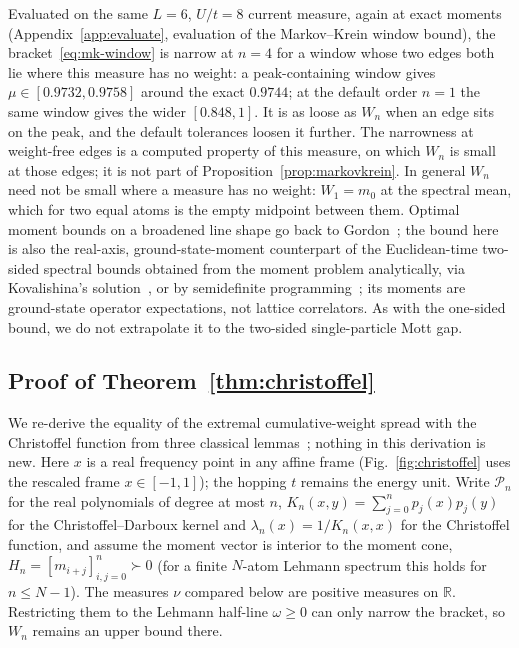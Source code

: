 \documentclass[submission, PhysCore]{SciPost}
\begin{document}
\begin{appendix}
Evaluated on the same $L=6$, $U/t=8$ current measure, again at exact moments (Appendix~\ref{app:evaluate}, evaluation of the Markov--Krein window bound), the bracket~\eqref{eq:mk-window} is narrow at $n=4$ for a window whose two edges both lie where this measure has no weight: a peak-containing window gives $\mu\in[0.9732,0.9758]$ around the exact $0.9744$; at the default order $n=1$ the same window gives the wider $[0.848,1]$. It is as loose as $W_n$ when an edge sits on the peak, and the default tolerances loosen it further. The narrowness at weight-free edges is a computed property of this measure, on which $W_n$ is small at those edges; it is not part of Proposition~\ref{prop:markovkrein}. In general $W_n$ need not be small where a measure has no weight: $W_1=m_0$ at the spectral mean, which for two equal atoms is the empty midpoint between them. Optimal moment bounds on a broadened line shape go back to Gordon~\cite{Gordon1968}; the bound here is also the real-axis, ground-state-moment counterpart of the Euclidean-time two-sided spectral bounds obtained from the moment problem analytically, via Kovalishina's solution~\cite{AbbottJayOare2025}, or by semidefinite programming~\cite{CausalBootstrap2026,CertifiedSpectral2026}; its moments are ground-state operator expectations, not lattice correlators. As with the one-sided bound, we do not extrapolate it to the two-sided single-particle Mott gap.

\subsection*{Proof of Theorem~\ref{thm:christoffel}}
We re-derive the equality of the extremal cumulative-weight spread with the Christoffel function from three classical lemmas~\cite{Akhiezer1965,KreinNudelman1977,GM2010}; nothing in this derivation is new. Here $x$ is a real frequency point in any affine frame (Fig.~\ref{fig:christoffel} uses the rescaled frame $x\in[-1,1]$); the hopping $t$ remains the energy unit. Write $\mathcal{P}_n$ for the real polynomials of degree at most $n$, $K_n(x,y)=\sum_{j=0}^{n}p_j(x)p_j(y)$ for the Christoffel--Darboux kernel and $\lambda_n(x)=1/K_n(x,x)$ for the Christoffel function, and assume the moment vector is interior to the moment cone, $H_n=[m_{i+j}]_{i,j=0}^{n}\succ 0$ (for a finite $N$-atom Lehmann spectrum this holds for $n\le N-1$). The measures $\nu$ compared below are positive measures on $\mathbb{R}$. Restricting them to the Lehmann half-line $\omega\ge0$ can only narrow the bracket, so $W_n$ remains an upper bound there.


\end{appendix}
\end{document}
